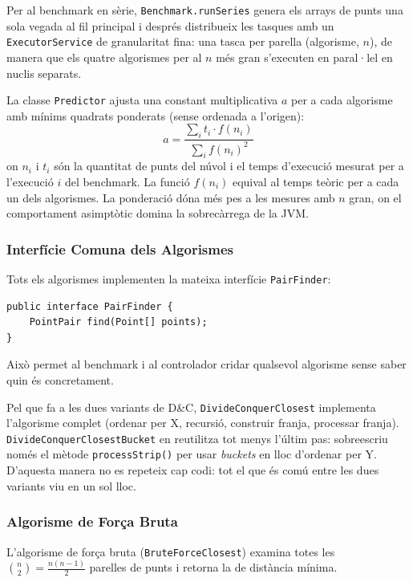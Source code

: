 \documentclass[conference,compsoc]{IEEEtran}
\begin{document}
Per al benchmark en sèrie, \texttt{Benchmark.runSeries} genera els
arrays de punts una sola vegada al fil principal i després distribueix
les tasques amb un \texttt{ExecutorService} de granularitat fina:
una tasca per parella (algorisme, $n$), de manera que els quatre
algorismes per al $n$ més gran s'executen en paral·lel en nuclis
separats.

La classe \texttt{Predictor} ajusta una constant multiplicativa $a$
per a cada algorisme amb mínims quadrats ponderats (sense ordenada a
l'origen):
\begin{equation}
a = \frac{\sum_i t_i \cdot f(n_i)}{\sum_i f(n_i)^2}
\end{equation}
on $n_i$ i $t_i$ són la quantitat de punts del núvol i el temps d'execució mesurat
per a l'execució $i$ del benchmark. La funció $f(n_i)$ equival al temps teòric
per a cada un dels algorismes. La ponderació dóna més pes
a les mesures amb $n$ gran, on el comportament asimptòtic domina la sobrecàrrega
de la JVM.

\subsubsection{Interfície Comuna dels Algorismes}

Tots els algorismes implementen la mateixa interfície \texttt{PairFinder}:

\begin{lstlisting}[caption={Interfície comuna per a tots els algorismes.},label={lst:pairfinder}]
public interface PairFinder {
    PointPair find(Point[] points);
}
\end{lstlisting}

Això permet al benchmark i al controlador cridar qualsevol algorisme
sense saber quin és concretament.

Pel que fa a les dues variants de D\&C, \texttt{DivideConquerClosest}
implementa l'algorisme complet (ordenar per X, recursió, construir franja,
processar franja). \texttt{DivideConquerClosestBucket} en reutilitza
tot menys l'últim pas: sobreescriu només el mètode \texttt{processStrip()}
per usar \textit{buckets} en lloc d'ordenar per Y. D'aquesta manera
no es repeteix cap codi: tot el que és comú entre les dues variants
viu en un sol lloc.

\subsubsection{Algorisme de Força Bruta}

L'algorisme de força bruta (\texttt{BruteForceClosest}) examina totes
les $\binom{n}{2} = \frac{n(n-1)}{2}$ parelles de punts i retorna
la de distància mínima.
\end{document}
